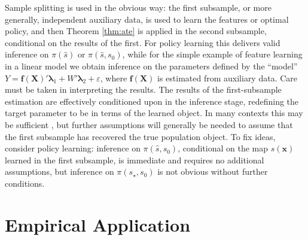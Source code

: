 \documentclass[11pt]{article}
\numberwithin{equation}{section}
\theoremstyle{definition}
\newcommand{\bx}{\bm{x}}
\newcommand{\bX}{\bm{X}}
\begin{document}
Sample splitting is used in the obvious way: the first subsample, or more generally, independent auxiliary data, is used to learn the features or optimal policy, and then Theorem \ref{thm:ate} is applied in the second subsample, conditional on the results of the first. For policy learning this delivers valid inference on $\pi(\hat{s})$ or $\pi(\hat{s}, s_0)$, while for the simple example of feature learning in a linear model we obtain inference on the parameters defined by the ``model'' $Y = \bm{f}(\bX)'\bm{\lambda}_1 + W'\bm{\lambda}_2 + \varepsilon$, where $\bm{f}(\bX)$ is estimated from auxiliary data. Care must be taken in interpreting the results. The results of the first-subsample estimation are effectively conditioned upon in the inference stage, redefining the target parameter to be in terms of the learned object. In many contexts this may be sufficient \citep{Chernozhukov-etal2018_generic}, but further assumptions will generally be needed to assume that the first subsample has recovered the true population object. To fix ideas, consider policy learning: inference on $\pi(\hat{s}, s_0)$, conditional on the map $\hat{s}(\bx)$ learned in the first subsample, is immediate and requires no additional assumptions, but inference on $\pi(s_\star, s_0)$ is not obvious without further conditions.



















\section{Empirical Application}
	\label{sec:application}
\end{document}
